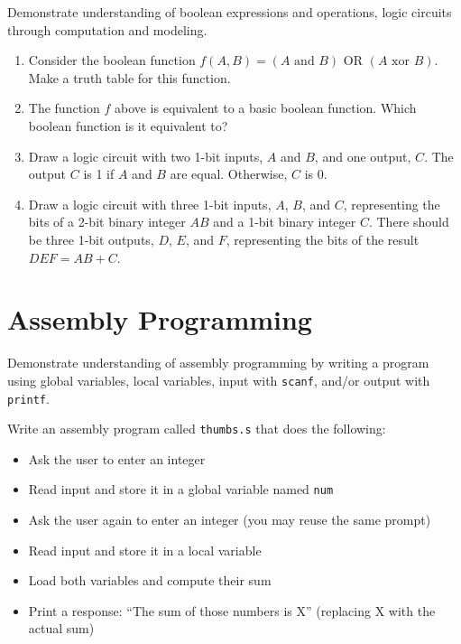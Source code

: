 \documentclass[12pt]{article}
\begin{document}
Demonstrate understanding of boolean expressions and operations, logic circuits through computation and modeling.

\begin{enumerate}
\item Consider the boolean function $f(A,B) = (A\textrm{ and }B)\textrm{ OR }(A\textrm{ xor }B)$. Make a truth table for this function.
\vfill

\item The function $f$ above is equivalent to a basic boolean function. Which boolean function is it equivalent to?
\vfill

\pagebreak

\item Draw a logic circuit with two 1-bit inputs, $A$ and $B$, and one output, $C$. The output $C$ is 1 if $A$ and $B$ are equal. Otherwise, $C$ is 0.
\vfill

\item Draw a logic circuit with three 1-bit inputs, $A$, $B$, and $C$, representing the bits of a 2-bit binary integer $AB$ and a 1-bit binary integer $C$. There should be three 1-bit outputs, $D$, $E$, and $F$, representing the bits of the result $DEF = AB + C$.
\vfill
\end{enumerate}

\vfill

\standardsfooter

\newpage



\section*{Assembly Programming}

Demonstrate understanding of assembly programming by writing a program using global variables, local variables, input with \texttt{scanf}, and/or output with \texttt{printf}.

Write an assembly program called \texttt{thumbs.s} that does the following:
\begin{itemize}
\item Ask the user to enter an integer
\item Read input and store it in a global variable named \texttt{num}
\item Ask the user again to enter an integer (you may reuse the same prompt)
\item Read input and store it in a local variable
\item Load both variables and compute their sum
\item Print a response: ``The sum of those numbers is X'' (replacing X with the actual sum)
\end{itemize}
\end{document}
